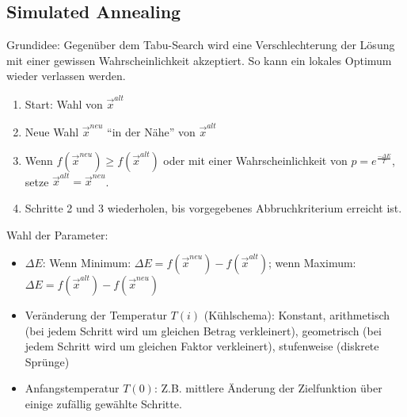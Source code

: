 \subsection{Simulated Annealing }
  Grundidee: Gegenüber dem Tabu-Search wird eine Verschlechterung der Lösung mit einer gewissen Wahrscheinlichkeit akzeptiert. So kann ein lokales Optimum wieder verlassen werden.
  
  \begin{enumerate}
    \item Start: Wahl von $\vec{x}^{alt}$
    \item Neue Wahl $\vec{x}^{neu}$ "`in der Nähe"' von $\vec{x}^{alt}$
    \item Wenn $f(\vec{x}^{neu}) \geq f(\vec{x}^{alt})$ oder mit einer Wahrscheinlichkeit von $p = e^{\frac{-\Delta E}{T}}$, setze $\vec{x}^{alt} = \vec{x}^{neu}$.
    \item Schritte 2 und 3 wiederholen, bis vorgegebenes Abbruchkriterium erreicht ist.
  \end{enumerate}
  
  Wahl der Parameter:
  \begin{itemize}
    \item $\Delta E$: Wenn Minimum: $\Delta E = f(\vec{x}^{neu}) - f(\vec{x}^{alt})$; wenn Maximum: $\Delta E = f(\vec{x}^{alt}) - f(\vec{x}^{neu})$
    \item Veränderung der Temperatur $T(i)$ (Kühlschema): Konstant, arithmetisch (bei jedem Schritt wird um gleichen Betrag verkleinert), geometrisch (bei jedem Schritt wird um gleichen Faktor verkleinert), stufenweise (diskrete Sprünge)
    \item Anfangstemperatur $T(0)$: Z.B. mittlere Änderung der Zielfunktion über einige zufällig gewählte Schritte.
  \end{itemize}
  

